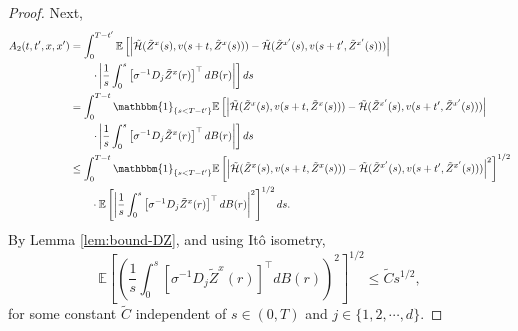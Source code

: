 \documentclass[11pt]{article}
\theoremstyle{definition}
\theoremstyle{plain}
\newcommand{\E}{\mathbb{E}}
\newcommand{\cH}{{\cal H}}
\newcommand{\mbOne}{\mathbbm{1}}
\begin{document}
\begin{appendices}
\begin{proof}
Next,
\begin{align}
A_2(t, t', x, x') &= \int_0^{T - t'} 
\mathbb{E} \left[ \left| \tilde \cH(\tilde{Z}^x(s), v(s + t, \tilde{Z}^x(s))) 
- \tilde \cH(\tilde{Z}^{x'}(s), v(s + t', \tilde{Z}^{x'}(s))) \right| \right. \nonumber \\
&\qquad \left. \cdot \left| \frac{1}{s} \int_0^s \left[\sigma^{-1} D_j \tilde{Z}^x(r)\right]^{\top} dB(r) \right| \right] ds \nonumber \\
&= \int_0^{T - t} \mbOne_{\{s < T - t'\}} 
\mathbb{E} \left[ \left| \tilde \cH(\tilde{Z}^x(s), v(s + t, \tilde{Z}^x(s))) 
- \tilde \cH(\tilde{Z}^{x'}(s), v(s + t', \tilde{Z}^{x'}(s))) \right| \right. \nonumber \\
&\qquad \left. \cdot \left| \frac{1}{s} \int_0^s \left[\sigma^{-1} D_j \tilde{Z}^x(r)\right]^{\top} dB(r) \right| \right] ds \nonumber \\
&\le \int_0^{T - t} \mbOne_{\{s < T - t'\}} 
\mathbb{E} \left[ \left| \tilde \cH(\tilde{Z}^x(s), v(s + t, \tilde{Z}^x(s))) 
- \tilde \cH(\tilde{Z}^{x'}(s), v(s + t', \tilde{Z}^{x'}(s))) \right|^2 \right]^{1/2} \nonumber \\
& \qquad \cdot\E\left[\left| \frac{1}{s} \int_0^s \left[\sigma^{-1} D_j \tilde{Z}^x(r)\right]^{\top} dB(r) \right|^2 \right]^{1/2} ds.
\label{eq:A2-bound0}
\end{align}
By Lemma \ref{lem:bound-DZ}, and using Itô isometry, 
\begin{equation} \label{eq:A2-bel-bound}
\mathbb{E} \left[ \left( \frac{1}{s} \int_0^s \left[\sigma^{-1} D_j \tilde{Z}^x(r)\right]^{\top} dB(r) \right)^2 \right]^{1/2}
\leq {\tilde C} s^{1/2},
\end{equation}
for some constant \( {\tilde C} \) independent of \( s \in (0,T) \) and $j \in \{1, 2, \cdots, d\}$.


\end{proof}
\end{appendices}
\end{document}

